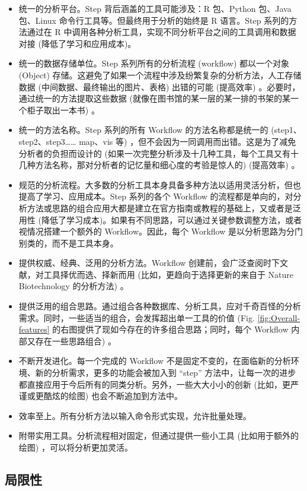 \documentclass[
]{article}
\begin{document}
\begin{itemize}
\item
  统一的分析平台。Step 背后涵盖的工具可能涉及：R 包、Python 包、Java 包、Linux 命令行工具等。但最终用于分析的始终是 R 语言。Step 系列的方法通过在 R 中调用各种分析工具，实现不同分析平台之间的工具调用和数据对接 (降低了学习和应用成本)。
\item
  统一的数据存储单位。Step 系列所有的分析流程 (workflow) 都以一个对象 (Object) 存储。这避免了如果一个流程中涉及纷繁复杂的分析方法，人工存储数据 (中间数据、最终输出的图片、表格) 出错的可能 (提高效率) 。必要时，通过统一的方法提取这些数据 (就像在图书馆的某一层的某一排的书架的某一个柜子取出一本书) 。
\item
  统一的方法名称。Step 系列的所有 Workflow 的方法名称都是统一的 (step1、step2、step3\ldots\ldots{} map、vis 等) ，但不会因为一同调用而出错。这是为了减免分析者的负担而设计的 (如果一次完整分析涉及十几种工具，每个工具又有十几种方法名称，那对分析者的记忆量和细心度的考验是惊人的) (提高效率) 。
\item
  规范的分析流程。大多数的分析工具本身具备多种方法以适用灵活分析，但也提高了学习、应用成本。Step 系列的各个 Workflow 的流程都是单向的，对分析方法或思路的组合应用大都是建立在官方指南或教程的基础上，又或者是泛用性 (降低了学习成本)。如果有不同思路，可以通过关键参数调整方法，或者视情况搭建一个额外的 Workflow。因此，每个 Workflow 是以分析思路为分门别类的，而不是工具本身。
\item
  提供权威、经典、泛用的分析方法。Workflow 创建前，会广泛查阅时下文献，对工具择优而选、择新而用 (比如，更趋向于选择更新的来自于 Nature Biotechnology 的分析方法) 。
\item
  提供泛用的组合思路。通过组合各种数据库、分析工具，应对千奇百怪的分析需求。同时，一些适当的组合，会发挥超出单一工具的价值 (Fig. \ref{fig:Overall-features} 的右图提供了现如今存在的许多组合思路；同时，每个 Workflow 内部又存在一些思路组合) 。
\item
  不断开发进化。每一个完成的 Workflow 不是固定不变的，在面临新的分析环境、新的分析需求，更多的功能会被加入到 ``step'' 方法中，让每一次的进步都直接应用于今后所有的同类分析。另外，一些大大小小的创新 (比如，更严谨或更酷炫的绘图) 也会不断追加到方法中。
\item
  效率至上。所有分析方法以输入命令形式实现，允许批量处理。
\item
  附带实用工具。分析流程相对固定，但通过提供一些小工具 (比如用于额外的绘图) ，可以将分析更加灵活。
\end{itemize}

\hypertarget{ux5c40ux9650ux6027}{%
\subsection{局限性}\label{ux5c40ux9650ux6027}}
\end{document}
